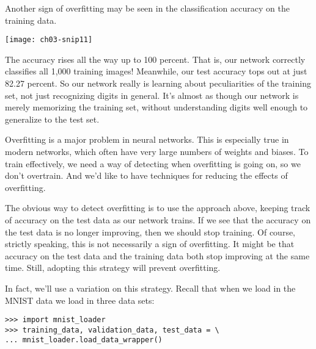 Another sign of overfitting may be seen in the classification accuracy on the training data.
\begin{marginfigure}
\texttt{[image: ch03-snip11]}
\end{marginfigure}
The accuracy rises all the way up to 100
percent. That is, our network correctly classifies all 1,000 training images! Meanwhile, our test accuracy tops out at just 82.27
percent. So our network really is learning about peculiarities of the training set, not just recognizing digits in general. It's almost as though our network is merely memorizing the training set, without understanding digits well enough to generalize to the test set.

Overfitting is a major problem in neural networks. This is especially true in modern networks, which often have very large numbers of weights and biases. To train effectively, we need a way of detecting when overfitting is going on, so we don't overtrain. And we'd like to have techniques for reducing the effects of overfitting.

The obvious way to detect overfitting is to use the approach above, keeping track of accuracy on the test data as our network trains. If we see that the accuracy on the test data is no longer improving, then we should stop training. Of course, strictly speaking, this is not necessarily a sign of overfitting. It might be that accuracy on the test data and the training data both stop improving at the same time. Still, adopting this strategy will prevent overfitting.

In fact, we'll use a variation on this strategy. Recall that when we load in the MNIST data we load in three data sets: 
 
\begin{lstlisting}
>>> import mnist_loader 
>>> training_data, validation_data, test_data = \
... mnist_loader.load_data_wrapper()
\end{lstlisting}


